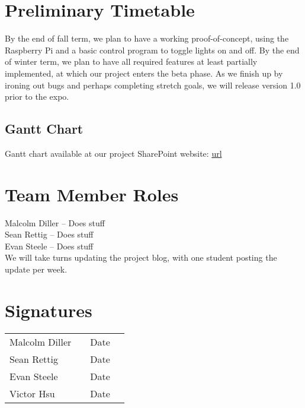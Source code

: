 \documentclass[12pt]{article}
\begin{document}
\section{Preliminary Timetable}

By the end of fall term, we plan to have a working proof-of-concept, using the
Raspberry Pi and a basic control program to toggle lights on and off.  By the
end of winter term, we plan to have all required features at least partially
implemented, at which our project enters the beta phase.  As we finish up by
ironing out bugs and perhaps completing stretch goals, we will release version
1.0 prior to the expo.

\subsection{Gantt Chart}
Gantt chart available at our project SharePoint website: \url{url}
\begin{sidewaysfigure}
\end{sidewaysfigure}

\pagebreak

\section{Team Member Roles}

Malcolm Diller -- Does stuff\\
Sean Rettig -- Does stuff\\
Evan Steele -- Does stuff\\

We will take turns updating the project blog, with one student posting the
update per week.

\section{Signatures}

\begin{tabular}{l l l l} Malcolm Diller & \underline{\hspace{6cm}} & Date
\underline{\hspace{2cm}}\\ Sean Rettig & \underline{\hspace{6cm}} & Date
\underline{\hspace{2cm}}\\ Evan Steele & \underline{\hspace{6cm}} & Date
\underline{\hspace{2cm}}\\ Victor Hsu & \underline{\hspace{6cm}} & Date
\underline{\hspace{2cm}} \end{tabular}
    
\end{document}
